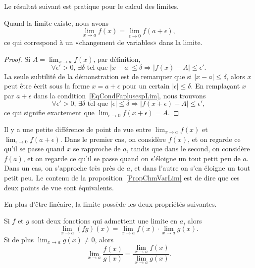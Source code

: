 Le résultat suivant est pratique pour le calcul des limites.
\begin{proposition}     \label{PropChmVarLim}
	Quand la limite existe, nous avons
	\[
		\lim_{x\to a}f(x)=\lim_{\epsilon\to 0}f(a+\epsilon),
	\]
	ce qui correspond à un «changement de variables» dans la limite.
\end{proposition}

\begin{proof}
	Si $A=\lim_{x\to a}f(x)$, par définition,
	\begin{equation}        \label{EqCondFaplusespLim}
		\forall\epsilon'>0,\,\exists\delta\text{ tel que }| x-a |\leq\delta\Rightarrow| f(x)-A |\leq\epsilon'.
	\end{equation}
	La seule subtilité de la démonstration est de remarquer que si $| x-a |\leq\delta$, alors $x$ peut être écrit sous la forme $x=a+\epsilon$ pour un certain $| \epsilon |\leq\delta$. En remplaçant $x$ par $a+\epsilon$ dans la condition~\ref{EqCondFaplusespLim}, nous trouvons
	\begin{equation}
		\forall\epsilon'>0,\,\exists\delta\text{ tel que }| \epsilon |\leq\delta\Rightarrow| f(x+\epsilon)-A |\leq\epsilon',
	\end{equation}
	ce qui signifie exactement que $\lim_{\epsilon\to 0}f(x+\epsilon)=A$.
\end{proof}

Il y a une petite différence de point de vue entre $\lim_{x\to a}f(x)$ et $\lim_{\epsilon\to 0}f(a+\epsilon)$. Dans le premier cas, on considère $f(x)$, et on regarde ce qu'il se passe quand $x$ se rapproche de $a$, tandis que dans le second, on considère $f(a)$, et on regarde ce qu'il se passe quand on s'éloigne un tout petit peu de $a$. Dans un cas, on s'approche très près de $a$, et dans l'autre on s'en éloigne un tout petit peu. Le contenu de la proposition~\ref{PropChmVarLim} est de dire que ces deux points de vue sont équivalents.


En plus d'être linéaire, la limite possède les deux propriétés suivantes.
\begin{proposition}     \label{PROPooDQFIooMMwxxJ}
	Si $f$ et $g$ sont deux fonctions qui admettent une limite en $a$, alors
	\begin{equation}
		\lim_{x\to a} (fg)(x)=\lim_{x\to a} f(x)\cdot\lim_{x\to a} g(x).
	\end{equation}
	Si de plus $\lim_{x\to a} g(x)\neq 0$, alors
	\begin{equation}
		\lim_{x\to a} \frac{ f(x) }{ g(x) }=\frac{ \lim_{x\to a} f(x) }{ \lim_{x\to a} g(x) }.
	\end{equation}
\end{proposition}

